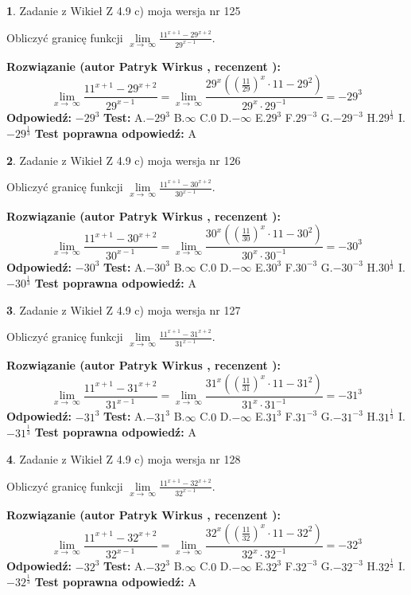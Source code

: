 \documentclass[12pt, a4paper]{article}
\theoremstyle{definition} %
\newtheorem{zad}{}
\newcommand{\zadStart}[1]{\begin{zad}#1\newline}
\newcommand{\zadStop}{\end{zad}}
\newcommand{\rozwStart}[2]{\noindent \textbf{Rozwiązanie (autor #1 , recenzent #2): }\newline}
\newcommand{\rozwStop}{\newline}
\newcommand{\odpStart}{\noindent \textbf{Odpowiedź:}\newline}
\newcommand{\odpStop}{\newline}
\newcommand{\testStart}{\noindent \textbf{Test:}\newline}
\newcommand{\testStop}{\newline}
\newcommand{\kluczStart}{\noindent \textbf{Test poprawna odpowiedź:}\newline}
\newcommand{\kluczStop}{\newline}
\begin{document}
\zadStart{Zadanie z Wikieł Z 4.9 c) moja wersja nr 125}


Obliczyć granicę funkcji  $\lim\limits_{x\to\ \infty}\frac{11^{x+1}-29^{x+2}}{29^{x-1}}$.
\zadStop
\rozwStart{Patryk Wirkus}{}
$$\lim\limits_{x\to\ \infty}\frac{11^{x+1}-29^{x+2}}{29^{x-1}}=\lim\limits_{x\to\ \infty}\frac{29^{x}((\frac{11}{29})^{x}\cdot 11 -29^{2})}{29^{x}\cdot 29^{-1}} = -29^{3}$$
\rozwStop
\odpStart
$-29^{3}$
\odpStop
\testStart
A.$-29^{3}$ B.$\infty$ C.$0$ D.$-\infty$ E.$29^{3}$
F.$29^{-3}$ G.$-29^{-3}$
H.$29^{\frac{1}{3}}$
I.$-29^{\frac{1}{3}}$
\testStop
\kluczStart
A
\kluczStop



\zadStart{Zadanie z Wikieł Z 4.9 c) moja wersja nr 126}


Obliczyć granicę funkcji  $\lim\limits_{x\to\ \infty}\frac{11^{x+1}-30^{x+2}}{30^{x-1}}$.
\zadStop
\rozwStart{Patryk Wirkus}{}
$$\lim\limits_{x\to\ \infty}\frac{11^{x+1}-30^{x+2}}{30^{x-1}}=\lim\limits_{x\to\ \infty}\frac{30^{x}((\frac{11}{30})^{x}\cdot 11 -30^{2})}{30^{x}\cdot 30^{-1}} = -30^{3}$$
\rozwStop
\odpStart
$-30^{3}$
\odpStop
\testStart
A.$-30^{3}$ B.$\infty$ C.$0$ D.$-\infty$ E.$30^{3}$
F.$30^{-3}$ G.$-30^{-3}$
H.$30^{\frac{1}{3}}$
I.$-30^{\frac{1}{3}}$
\testStop
\kluczStart
A
\kluczStop



\zadStart{Zadanie z Wikieł Z 4.9 c) moja wersja nr 127}


Obliczyć granicę funkcji  $\lim\limits_{x\to\ \infty}\frac{11^{x+1}-31^{x+2}}{31^{x-1}}$.
\zadStop
\rozwStart{Patryk Wirkus}{}
$$\lim\limits_{x\to\ \infty}\frac{11^{x+1}-31^{x+2}}{31^{x-1}}=\lim\limits_{x\to\ \infty}\frac{31^{x}((\frac{11}{31})^{x}\cdot 11 -31^{2})}{31^{x}\cdot 31^{-1}} = -31^{3}$$
\rozwStop
\odpStart
$-31^{3}$
\odpStop
\testStart
A.$-31^{3}$ B.$\infty$ C.$0$ D.$-\infty$ E.$31^{3}$
F.$31^{-3}$ G.$-31^{-3}$
H.$31^{\frac{1}{3}}$
I.$-31^{\frac{1}{3}}$
\testStop
\kluczStart
A
\kluczStop



\zadStart{Zadanie z Wikieł Z 4.9 c) moja wersja nr 128}


Obliczyć granicę funkcji  $\lim\limits_{x\to\ \infty}\frac{11^{x+1}-32^{x+2}}{32^{x-1}}$.
\zadStop
\rozwStart{Patryk Wirkus}{}
$$\lim\limits_{x\to\ \infty}\frac{11^{x+1}-32^{x+2}}{32^{x-1}}=\lim\limits_{x\to\ \infty}\frac{32^{x}((\frac{11}{32})^{x}\cdot 11 -32^{2})}{32^{x}\cdot 32^{-1}} = -32^{3}$$
\rozwStop
\odpStart
$-32^{3}$
\odpStop
\testStart
A.$-32^{3}$ B.$\infty$ C.$0$ D.$-\infty$ E.$32^{3}$
F.$32^{-3}$ G.$-32^{-3}$
H.$32^{\frac{1}{3}}$
I.$-32^{\frac{1}{3}}$
\testStop
\kluczStart
A
\kluczStop
\end{document}
